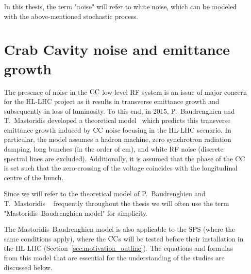 In this thesis, the term "noise" will refer to white noise, which can be modeled with the above-mentioned stochastic process.





\section{Crab Cavity noise and emittance growth}\label{sec:CC_noise_intro}
The presence of noise in the ${\mathrm{CC}}$ low-level RF system is an issue of major concern for the HL-LHC project as it results in transverse emittance growth and subsequently in loss of luminosity. To this end, in 2015, P.~Baudrenghien and T.~Mastoridis developed a theoretical model~\cite{PhysRevSTAB.18.101001} which predicts this transverse emittance growth induced by ${\mathrm{CC}}$ noise focusing in the HL-LHC scenario. In particular, the model assumes a hadron machine, zero synchrotron radiation damping, long bunches (in the order of cm), and white RF noise (discrete spectral lines are excluded). Additionally, it is assumed that the phase of the CC is set such that the zero-crossing of the voltage coincides with the longitudinal centre of the bunch.

Since we will refer to the theoretical model of P.~Baudrenghien and T.~Mastoridis ~\cite{PhysRevSTAB.18.101001} frequently throughout the thesis we will often use the term "Mastoridis--Baudrenghien model" for simplicity.

The Mastoridis--Baudrenghien model is also applicable to the SPS (where the same conditions apply), where the ${\mathrm{CC}}$s will be tested before their installation in the HL-LHC (Section~\ref{sec:motivation_outline}). The equations and formulas from this model that are essential for the understanding of the studies are discussed below.





